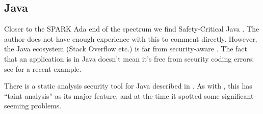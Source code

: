 \documentclass{llncs}
\begin{document}
\subsection{Java}
Closer to the SPARK Ada end of the spectrum we find Safety-Critical Java \cite{Cavalcantietal2017a}.  The author does not have enough experience with this to comment directly. However, the Java ecosystem (Stack Overflow etc.) is far from security-aware \cite{Mengetal2018a}.                                                                                                                                                                                                                                                                                                                                                   The fact that an application is in Java doesn't mean it's free from security coding errors: see \cite{Google2018a} for a recent example.
\par
There is a static analysis security tool for Java described in \cite{LivshitsLam2005}.
As with \cite{ISO2013d}, this has ``taint analysis'' as its major feature, and at the time it spotted some significant-seeming problems.
\end{document}
